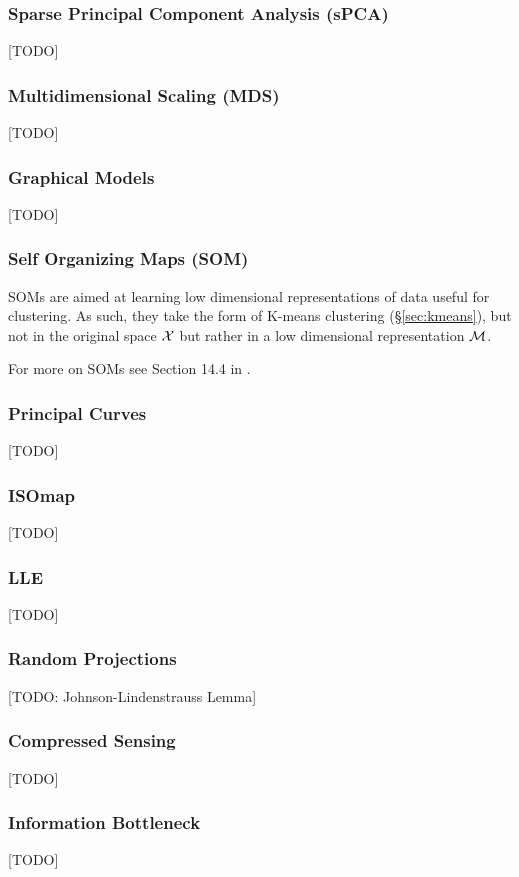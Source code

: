 \subsubsection{Sparse Principal Component Analysis (sPCA)}
[TODO]



\subsubsection{Multidimensional Scaling (MDS)}
\label{sec:MDS}
[TODO]


\subsubsection{Graphical Models}
\label{sec:graphical_model}
[TODO]



\subsubsection{Self Organizing Maps (SOM)}
SOMs are aimed at learning low dimensional representations of data useful for clustering. 
As such, they take the form of K-means clustering (\S\ref{sec:kmeans}), but not in the original space $\mathcal{X}$ but rather in a low dimensional representation $\mathcal{M}$.

For more on SOMs see Section 14.4 in \cite{hastie_elements_2003}. 



\subsubsection{Principal Curves}
[TODO]


\subsubsection{ISOmap}
[TODO]


\subsubsection{LLE}
[TODO]



\subsubsection{Random Projections}
[TODO: Johnson-Lindenstrauss Lemma]



\subsubsection{Compressed Sensing}
\label{sec:compressed_sensing}
[TODO]



\subsubsection{Information Bottleneck}
[TODO]


\begin{remark}
\end{remark}





